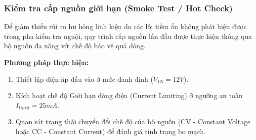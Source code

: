         \subsubsection{Kiểm tra cấp nguồn giới hạn (Smoke Test / Hot Check)}
            Để giảm thiểu rủi ro hư hỏng linh kiện do các lỗi tiềm ẩn không phát hiện được trong pha kiểm tra nguội, quy trình cấp nguồn lần đầu được thực hiện thông qua bộ nguồn đa năng với chế độ bảo vệ quá dòng.

            \textbf{Phương pháp thực hiện:}
            \begin{enumerate}
                \item Thiết lập điện áp đầu vào ở mức danh định ($V_{IN} = 12V$).
                \item Kích hoạt chế độ Giới hạn dòng điện (Current Limiting) ở ngưỡng an toàn $I_{limit} = 25mA$.
                \item Quan sát trạng thái chuyển đổi chế độ của bộ nguồn (CV - Constant Voltage hoặc CC - Constant Current) để đánh giá tình trạng bo mạch.
            \end{enumerate}

